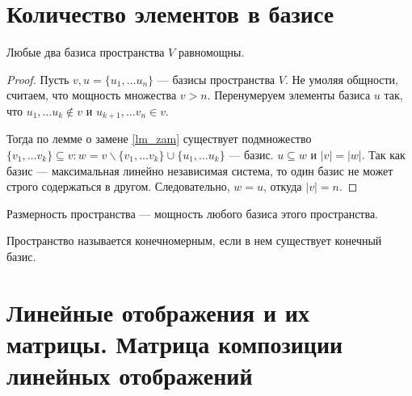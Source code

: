 \documentclass[11pt]{book}
\theoremstyle{definition}
\theoremstyle{plain}
\theoremstyle{plain}
\theoremstyle{definition}
\theoremstyle{remark}
\begin{document}
\section{Количество элементов в базисе}
\begin{thm}
    Любые два базиса пространства $ V$ равномощны.
\end{thm}
\begin{proof}
    Пусть $ v, u = \{u_1, \ldots u_n\}$ ---  базисы пространства $ V$. Не умоляя общности, считаем, что мощность множества  $ v > n$. Перенумеруем элементы базиса  $ u$ так, что $ u_1, \ldots u_k \not\in v$ и $ u_{k+1}, \ldots  v_n \in v$.

    Тогда по лемме о замене \ref{lm_zam} существует подмножество $ \{v_1, \ldots v_k\} \subseteq v: w = v \smallsetminus \{v_1, \ldots v_k\} \cup \{u_1, \ldots u_k\}$ --- базис. $ u \subseteq w$ и $ |v|  = |w|$. Так как базис --- максимальная линейно независимая система, то один базис не может строго содержаться в другом. Следовательно, $ w = u$, откуда  $ |v|  = n$.
\end{proof}
\begin{defn}
    {\sf Размерность пространства} --- мощность любого базиса этого пространства.

    Пространство называется {\sf конечномерным}, если в нем существует конечный базис.
\end{defn}
\section{Линейные отображения и их матрицы. Матрица композиции линейных отображений}
\end{document}
